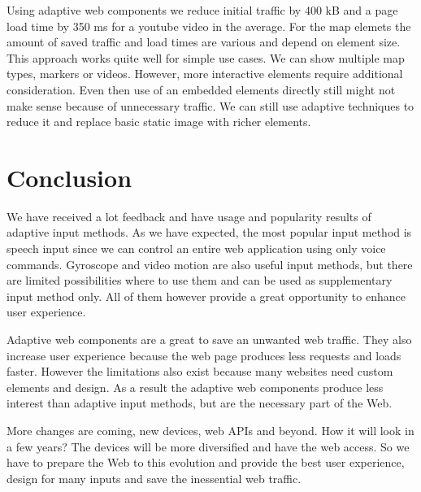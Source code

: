 \documentclass{iitsrc}
\begin{document}
Using adaptive web components we reduce initial traffic by 400 kB and a page load time by 350 ms for a youtube video in the average. For the map elemets the amount of saved traffic and load times are various and depend on element size. This approach works quite well for simple use cases. We can show multiple map types, markers or videos. However, more interactive elements require additional consideration. Even then use of an embedded elements directly still might not make sense because of unnecessary traffic. We can still use adaptive techniques to reduce it and replace basic static image with richer elements.




\section{Conclusion} %
\label{sec:conclusion}

We have received a lot feedback and have usage and popularity results of adaptive input methods. As we have expected, the most popular input method is speech input since we can control an entire web application using only voice commands. Gyroscope and video motion are also useful input methods, but there are limited possibilities where to use them and can be used as supplementary input method only. All of them however provide a great opportunity to enhance user experience.

Adaptive web components are a great to save an unwanted web traffic. They also increase user experience because the web page produces less requests and loads faster. However the limitations also exist because many websites need custom elements and design. As a result the adaptive web components produce less interest than adaptive input methods, but are the necessary part of the Web.

More changes are coming, new devices, web APIs and beyond. How it will look in a few years? The devices will be more diversified and have the web access. So we have to prepare the Web to this evolution and provide the best user experience, design for many inputs and save the inessential web traffic.




\end{document}
